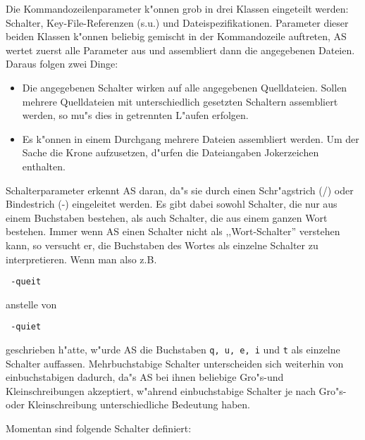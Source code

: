 \documentclass[12pt,a4paper,twoside]{report}
\makeatletter
\newcommand{\tty}[1]{{\tt #1}}
\newcommand{\ttindex}[1]{\index{#1@{\tt #1}}}
\makeatother
\begin{document}
Die Kommandozeilenparameter k"onnen grob in drei Klassen eingeteilt
werden: Schalter, Key-File-Referenzen (s.u.) und Dateispezifikationen.
Parameter dieser beiden Klassen k"onnen beliebig gemischt in der
Kommandozeile auftreten, AS wertet zuerst alle Parameter aus und
assembliert dann die angegebenen Dateien. Daraus folgen zwei Dinge:
\begin{itemize}
\item{Die angegebenen Schalter wirken auf alle angegebenen Quelldateien.
      Sollen mehrere Quelldateien mit unterschiedlich gesetzten Schaltern
      assembliert werden, so mu"s dies in getrennten L"aufen erfolgen.}
\item{Es k"onnen in einem Durchgang mehrere Dateien assembliert werden.
      Um der Sache die Krone aufzusetzen, d"urfen die Dateiangaben
      Jokerzeichen enthalten.}
\end{itemize}
Schalterparameter erkennt AS daran, da"s sie durch einen
Schr"agstrich (/) oder Bindestrich (-) eingeleitet werden.  Es gibt dabei
sowohl Schalter, die nur aus einem Buchstaben bestehen, als auch Schalter,
die aus einem ganzen Wort bestehen.  Immer wenn AS einen Schalter nicht
als ,,Wort-Schalter'' verstehen kann, so versucht er, die Buchstaben des
Wortes als einzelne Schalter zu interpretieren.  Wenn man also z.B.
\begin{verbatim}
 -queit
\end{verbatim}
anstelle von
\begin{verbatim}
 -quiet
\end{verbatim}
geschrieben h"atte, w"urde AS die Buchstaben \tty{q, u, e, i} und \tty{t}
als einzelne Schalter auffassen.  Mehrbuchstabige Schalter unterscheiden
sich weiterhin von einbuchstabigen dadurch, da"s AS bei ihnen beliebige
Gro"s-und Kleinschreibungen akzeptiert, w"ahrend einbuchstabige Schalter
je nach Gro"s- oder Kleinschreibung unterschiedliche Bedeutung haben.
\par
Momentan sind folgende Schalter definiert:
\ttindex{SHARED}
\end{document}
